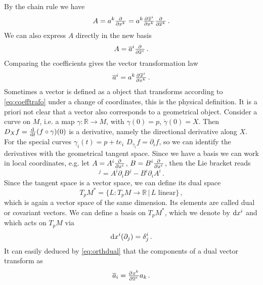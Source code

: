 By the chain rule we have
\begin{equation}
    A= a^k\pd{}{{x^k}}= a^k\pd{\overline{x}^i}{{x^k}}\pd{}{{\overline{x}^k}}\, .
\end{equation}
We can also express $A$ directly in the new basis
\begin{equation}
    A= \overline{a}^i\pd{}{{\overline{x}^i}}\, .
\end{equation}
Comparing the coefficients gives the vector transformation law
\begin{equation}
    \overline{a}^i=a^k\pd{\overline{x}^i}{{x^k}}\label{eq:coefftrafo}\, .
\end{equation}
Sometimes a vector is defined as a object that transforms according to \ref{eq:coefftrafo} under a change of coordinates, 
this is the physical definition. It is a priori not clear that a vector also corresponds to a geometrical object. 
Consider a curve on $M$, i.e. a map $\gamma:\mathbb{R}\to M$, with
$\gamma(0)=p$, $\dot{\gamma}(0)=X$. Then $D_X f=\od{}{t}(f\circ\gamma)(0)$ is
a derivative, namely the directional derivative along $X$.
For the special curves $\gamma_i(t)=p+te_i$
$D_{\dot{\gamma}_i} f=\partial_if$, so we can identify the derivatives with
the geometrical tangent space.
Since we have a basis we can work in local coordinates, 
e.g. let $A=A^i\pd{}{{x^i}}$, $B=B^i\pd{}{{x^i}}$, then the Lie bracket reads
\begin{equation}
    [A,B]^j=A^i\partial_iB^j-B^i\partial_iA^i\, .
\end{equation}
Since the tangent space is a vector space, we can define its dual space
\begin{equation}
    T_pM^*=\{L:T_pM\to \mathbb{R}\, |\, L \text{ linear}\}\, ,
\end{equation}
which is again a vector space of the same dimension. Its elements are called dual or covariant vectors.
We can define a basis on $	T_pM^*$, which we denote by $\dif x^i$ and  which acts on $T_pM$ via
\begin{equation}
    \dif x^i(\partial_j)=\delta^i_j\, . \label{eq:orthdual}
\end{equation}
It can easily deduced by \eqref{eq:orthdual} that the components of a dual vector transform as
\begin{equation}
    \overline{a}_i=\pd{x^k}{{\overline{x}^i}}a_k\, .
\end{equation}
